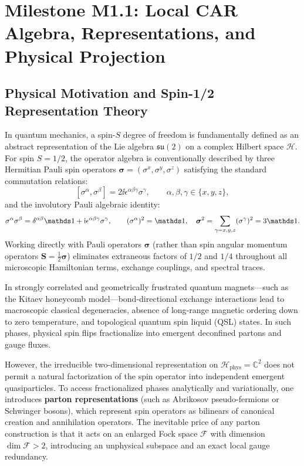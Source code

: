 \chapter{Milestone M1.1: Local CAR Algebra, Representations, and Physical Projection}
\label{ch:m1_1}

\section{Physical Motivation and Spin-1/2 Representation Theory}
\label{sec:m1_1_motivation}
In quantum mechanics, a spin-$S$ degree of freedom is fundamentally defined as an abstract representation of the Lie algebra $\mathfrak{su}(2)$ on a complex Hilbert space $\mathcal{H}$. For spin $S=1/2$, the operator algebra is conventionally described by three Hermitian Pauli spin operators $\bm{\sigma} = (\sigma^x, \sigma^y, \sigma^z)$ satisfying the standard commutation relations:
\begin{equation}
\label{eq:m1_1_spin_su2}
[\sigma^\alpha, \sigma^\beta] = 2\ii \epsilon^{\alpha\beta\gamma} \sigma^\gamma, \qquad \alpha, \beta, \gamma \in \{x, y, z\},
\end{equation}
and the involutory Pauli algebraic identity:
\begin{equation}
\label{eq:m1_1_pauli_involution}
\sigma^\alpha \sigma^\beta = \delta^{\alpha\beta}\Id + \ii \epsilon^{\alpha\beta\gamma}\sigma^\gamma, \qquad (\sigma^\alpha)^2 = \Id, \quad \bm{\sigma}^2 = \sum_{\gamma=x,y,z} (\sigma^\gamma)^2 = 3\Id.
\end{equation}
Working directly with Pauli operators $\bm{\sigma}$ (rather than spin angular momentum operators $\mathbf{S} = \frac{1}{2}\bm{\sigma}$) eliminates extraneous factors of $1/2$ and $1/4$ throughout all microscopic Hamiltonian terms, exchange couplings, and spectral traces.

In strongly correlated and geometrically frustrated quantum magnets—such as the Kitaev honeycomb model—bond-directional exchange interactions lead to macroscopic classical degeneracies, absence of long-range magnetic ordering down to zero temperature, and topological quantum spin liquid (QSL) states. In such phases, physical spin flips fractionalize into emergent deconfined partons and gauge fluxes.

However, the irreducible two-dimensional representation on $\mathcal{H}_{\mathrm{phys}} = \mathbb{C}^2$ does not permit a natural factorization of the spin operator into independent emergent quasiparticles. To access fractionalized phases analytically and variationally, one introduces \textbf{parton representations} (such as Abrikosov pseudo-fermions or Schwinger bosons), which represent spin operators as bilinears of canonical creation and annihilation operators. The inevitable price of any parton construction is that it acts on an enlarged Fock space $\mathcal{F}$ with dimension $\dim \mathcal{F} > 2$, introducing an unphysical subspace and an exact local gauge redundancy.

